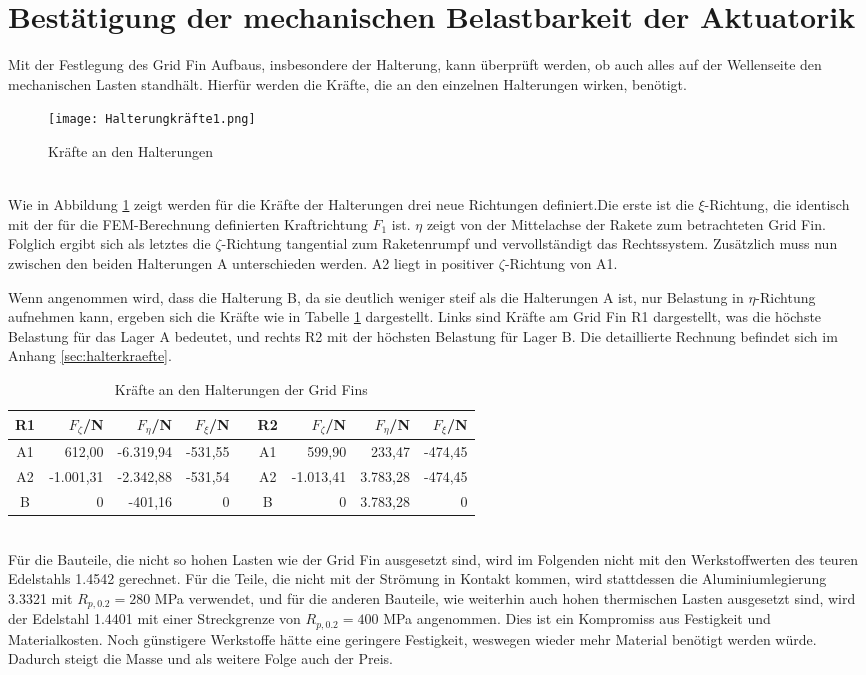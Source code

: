 \section{Bestätigung der mechanischen Belastbarkeit der Aktuatorik} \label{sec:AktuSim}
Mit der Festlegung des Grid Fin Aufbaus, insbesondere der Halterung, kann überprüft werden, ob auch alles auf der Wellenseite den mechanischen Lasten standhält. Hierfür werden die Kräfte, die an den einzelnen Halterungen wirken, benötigt.
\begin{figure}[h] 
	\centering
	\texttt{[image: Halterungkräfte1.png]}
	\caption{Kräfte an den Halterungen}
	\label{abb_richtungen_Halterungskräfte}
\end{figure}\\
Wie in Abbildung \ref{abb_richtungen_Halterungskräfte} zeigt werden für die Kräfte der Halterungen drei neue Richtungen definiert.Die erste ist die $\xi$-Richtung, die identisch mit der für die FEM-Berechnung definierten Kraftrichtung $F_1$ ist. $\eta$ zeigt von der Mittelachse der Rakete zum betrachteten Grid Fin. Folglich ergibt sich als letztes die $\zeta$-Richtung tangential zum Raketenrumpf und vervollständigt das Rechtssystem. Zusätzlich muss nun zwischen den beiden Halterungen A unterschieden werden. A2 liegt in positiver $\zeta$-Richtung von A1.

 Wenn angenommen wird, dass die Halterung B, da sie deutlich weniger steif als die Halterungen A ist, nur Belastung in $\eta$-Richtung aufnehmen kann, ergeben sich die Kräfte wie in Tabelle \ref{tab_Haltekräfte} dargestellt. Links sind Kräfte am Grid Fin R1 dargestellt, was die höchste Belastung für das Lager A bedeutet, und rechts R2 mit der höchsten Belastung für Lager B. Die detaillierte Rechnung befindet sich im Anhang \ref{sec:halterkraefte}. 
\begin{table}[h] 
	\centering 
	\caption{Kräfte an den Halterungen der Grid Fins}
	\label{tab_Haltekräfte}
	\begin{tabular}{c|r|r|rc||c|r|r|r} 
		\textbf{R1}&$F_{\zeta}$/N&$F_\eta$/N&$F_\xi$/N&&\textbf{R2}&$F_{\zeta}$/N&$F_\eta$/N&$F_\xi$/N\\ 
		\hline 
		A1& 612,00&-6.319,94&-531,55&&A1&599,90&233,47&-474,45\\
		A2&-1.001,31&-2.342,88&-531,54&&A2&-1.013,41&3.783,28&-474,45\\
		B&0&-401,16&0&&B&0&3.783,28&0\\
	\end{tabular}
\end{table} \\
Für die Bauteile, die nicht so hohen Lasten wie der Grid Fin ausgesetzt sind, wird im Folgenden nicht mit den Werkstoffwerten des teuren Edelstahls 1.4542 gerechnet. Für die Teile, die nicht mit der Strömung in Kontakt kommen, wird stattdessen die Aluminiumlegierung 3.3321 mit $R_{p,0.2} = 280$ MPa verwendet, und für die anderen Bauteile, wie weiterhin auch hohen thermischen Lasten ausgesetzt sind, wird der Edelstahl 1.4401 mit einer Streckgrenze von $R_{p,0.2} = 400$ MPa angenommen. Dies ist ein Kompromiss aus Festigkeit und Materialkosten. Noch günstigere Werkstoffe hätte eine geringere Festigkeit, weswegen wieder mehr Material benötigt werden würde. Dadurch steigt die Masse und als weitere Folge auch der Preis.
